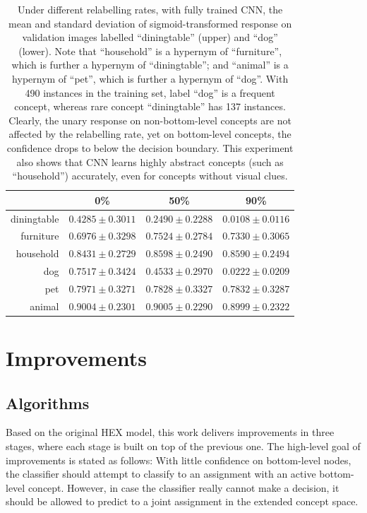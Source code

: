 \documentclass[11pt,a4paper]{article}
\begin{document}
\begin{table}[htbp]
\centering
\begin{tabular}{r|c|c|c}
 & 0\% & 50\% & 90\%\\
\hline
diningtable & $0.4285\pm0.3011$ & $0.2490\pm0.2288$ & $0.0108\pm0.0116$\\
furniture   & $0.6976\pm0.3298$ & $0.7524\pm0.2784$ & $0.7330\pm0.3065$\\
household   & $0.8431\pm0.2729$ & $0.8598\pm0.2490$ & $0.8590\pm0.2494$\\
\hline
dog         & $0.7517\pm0.3424$ & $0.4533\pm0.2970$ & $0.0222\pm0.0209$\\
pet         & $0.7971\pm0.3271$ & $0.7828\pm0.3327$ & $0.7832\pm0.3287$\\
animal      & $0.9004\pm0.2301$ & $0.9005\pm0.2290$ & $0.8999\pm0.2322$
\end{tabular}
\caption{Under different relabelling rates, with fully trained CNN, the mean and standard deviation of sigmoid-transformed response on validation images labelled ``diningtable'' (upper) and ``dog'' (lower). Note that ``household'' is a hypernym of ``furniture'', which is further a hypernym of ``diningtable''; and ``animal'' is a hypernym of ``pet'', which is further a hypernym of ``dog''. With 490 instances in the training set, label ``dog'' is a frequent concept, whereas rare concept ``diningtable'' has 137 instances. Clearly, the unary response on non-bottom-level concepts are not affected by the relabelling rate, yet on bottom-level concepts, the confidence drops to below the decision boundary.  This experiment also shows that CNN learns highly abstract concepts (such as ``household'') accurately, even for concepts without visual clues.}
\label{tab:response}
\end{table}

\clearpage
\section{Improvements}
\subsection{Algorithms}

Based on the original HEX model, this work delivers improvements in three stages, where each stage is built on top of the previous one. The high-level goal of improvements is stated as follows: With little confidence on bottom-level nodes, the classifier should attempt to classify to an assignment with an active bottom-level concept. However, in case the classifier really cannot make a decision, it should be allowed to predict to a joint assignment in the extended concept space.
\end{document}
